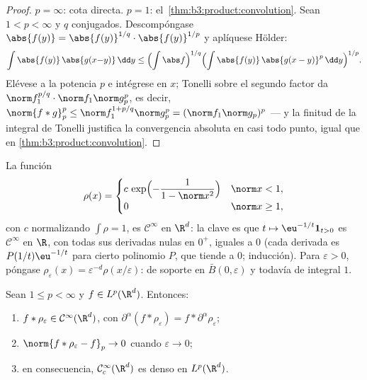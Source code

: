 \begin{proof}
$p = \infty$: cota directa. $p = 1$:
el~\cref{thm:b3:product:convolution}. Sean $1 < p < \infty$ y $q$
conjugados. Descompóngase $\abs{f(y)} = \abs{f(y)}^{1/q}\cdot
\abs{f(y)}^{1/p}$ y aplíquese Hölder:
\[
\int\abs{f(y)}\,\abs{g(x{-}y)}\,\dd y
\leq \Bigl(\int\abs f\Bigr)^{1/q}
\Bigl(\int\abs{f(y)}\,\abs{g(x - y)}^p\,\dd y\Bigr)^{1/p} .
\]
Elévese a la potencia $p$ e intégrese en $x$; Tonelli sobre el segundo
factor da $\norm f_1^{p/q}\cdot\norm f_1\norm g_p^p$, es decir,
$\norm{f*g}_p^p \leq \norm f_1^{1 + p/q}\norm g_p^p =
(\norm f_1\norm g_p)^p$ --- y la finitud de la integral de Tonelli
justifica la convergencia absoluta en casi todo punto, igual que en
\cref{thm:b3:product:convolution}.
\end{proof}

\begin{definition}\label{def:b3:lp:mollifier}
La función
\[
\rho(x) = \begin{cases}
c\,\exp\Bigl(-\dfrac{1}{1 - \norm x^2}\Bigr) & \norm x < 1,\\
0 & \norm x \geq 1,
\end{cases}
\]
con $c$ normalizando $\int\rho = 1$, es $\mathcal C^\infty$ en $\R^d$:
la clave es que $t \mapsto \eu^{-1/t}\mathbf
1_{t>0}$ es $\mathcal C^\infty$ en $\R$, con todas sus derivadas nulas
en $0^+$, iguales a $0$ (cada derivada es $P(1/t)\eu^{-1/t}$ para cierto
polinomio $P$, que tiende a $0$; inducción). Para $\varepsilon > 0$,
póngase $\rho_\varepsilon(x) =
\varepsilon^{-d}\rho(x/\varepsilon)$: de soporte en $\bar B(0,
\varepsilon)$ y todavía de integral $1$.
\end{definition}

\begin{theorem}[Regularización]\label{thm:b3:lp:regularization}
Sean $1 \leq p < \infty$ y $f \in L^p(\R^d)$. Entonces:
\begin{enumerate}
  \item $f * \rho_\varepsilon \in \mathcal C^\infty(\R^d)$,
        con $\partial^\alpha(f * \rho_\varepsilon) = f *
        \partial^\alpha\rho_\varepsilon$; \item
        $\norm{f * \rho_\varepsilon - f}_p \to 0$ cuando
        $\varepsilon \to 0$;
  \item en consecuencia, $\mathcal C^\infty_c(\R^d)$ es denso en
        $L^p(\R^d)$.
\end{enumerate}
\end{theorem}

